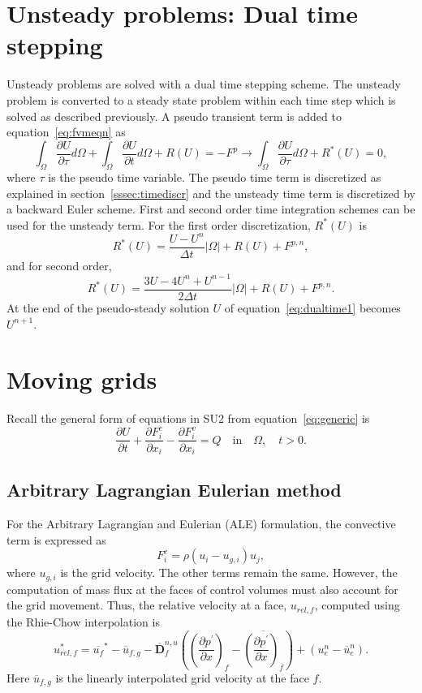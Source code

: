 \section{Unsteady problems: Dual time stepping}
Unsteady problems are solved with a dual time stepping scheme. The unsteady problem is converted to a steady state problem within each time step which is solved as described previously. A pseudo transient term is added to equation~\ref{eq:fvmeqn} as
\begin{equation}
\int_{\Omega}\frac{\partial U}{\partial \tau}d\Omega + \int_{\Omega}\frac{\partial U}{\partial t}d\Omega + R(U) = -F^p \rightarrow \int_{\Omega}\frac{\partial U}{\partial \tau}d\Omega + R^{\ast}(U) = 0,
\label{eq:dualtime1}
\end{equation}
where $\tau$ is the pseudo time variable. The pseudo time term is discretized as explained in section~\ref{sssec:timediscr} and the unsteady time term is discretized by a backward Euler scheme. First and second order time integration schemes can be used for the unsteady term. For the first order discretization, $R^{\ast}(U)$ is
\begin{equation}
R^{\ast}(U) = \frac{U-U^n}{\Delta t}|\Omega| + R(U) + F^{p,n},
\end{equation}
and for second order,
\begin{equation}
R^{\ast}(U) = \frac{3U -4U^n +U^{n-1}}{2\Delta t}|\Omega| + R(U) + F^{p,n}.
\end{equation}
At the end of the pseudo-steady solution $U$ of equation~\ref{eq:dualtime1} becomes $U^{n+1}$.
\section{Moving grids}\label{sec:roteqn}
Recall the general form of equations in SU2 from equation~\ref{eq:generic} is 
\begin{equation*}
\frac{\partial U}{\partial t}  + \frac{\partial F^c_i}{\partial x_i}-\frac{\partial F^v_i}{\partial x_i}=Q \quad \text{in} \quad \Omega, \quad t>0.
\end{equation*}
\subsection{Arbitrary Lagrangian Eulerian method}
For the Arbitrary Lagrangian and Eulerian (ALE) formulation, the convective term is expressed as
\begin{equation}
F^c_i = \rho (u_i -u_{g,i})u_j,
\end{equation}
where $u_{g,i}$ is the grid velocity. The other terms remain the same. However, the computation of mass flux at the faces of control volumes must also account for the grid movement. Thus, the relative velocity at a face, $u_{rel,f}$, computed using the Rhie-Chow interpolation is 
\begin{equation}
u_{rel,f}^{\ast}=\overline{u_{f}}^{\ast} - \overline{u}_{f,g} -\overline{\boldsymbol{D}}^{n,u}_f\left(\left(\frac{\partial p^{\prime}}{\partial x}\right)_{f}-\overline{\left(\frac{\partial p^{\prime}}{\partial x}\right)_{f}}\right) + \left(u_{e}^n - \overline{u}_{e}^n\right).
\label{eq:velatfmov}
\end{equation}
Here $\overline{u}_{f,g}$ is the linearly interpolated grid velocity at the face $f$.
